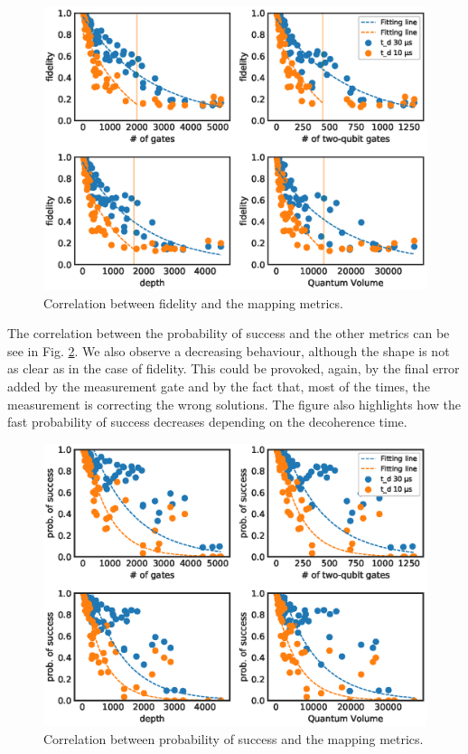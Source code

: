 \begin{figure}[htbp]
\centering
\includegraphics[width=\textwidth]{figures/f_metrics_correlation_poly.eps}
\caption{\label{fig:f_metrics_correlation}
Correlation between fidelity and the mapping metrics.}
\end{figure}

The correlation between the probability of success and the other metrics can be see in Fig. \ref{fig:ps_metrics_correlation}.
We also observe a decreasing behaviour, although the shape is not as clear as in the case of fidelity.
This could be provoked, again, by the final error added by the measurement gate and by the fact that, most of the times, the measurement is correcting the wrong solutions.
The figure also highlights how the fast probability of success decreases depending on the decoherence time.

\begin{figure}[htbp]
\centering
\includegraphics[width=\textwidth]{figures/ps_metrics_correlation.eps}
\caption{\label{fig:ps_metrics_correlation}
Correlation between probability of success and the mapping metrics.}
\end{figure}

